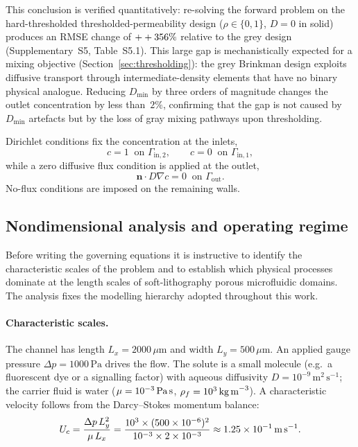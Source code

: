This conclusion is verified quantitatively: re-solving the forward
problem on the hard-thresholded thresholded-permeability design ($\rho \in \{0,1\}$,
$D = 0$ in solid) produces an RMSE change of $++356\%$
relative to the grey design (Supplementary~S5, Table~S5.1).
This large gap is mechanistically expected for a mixing objective
(Section~\ref{sec:thresholding}): the grey Brinkman design exploits
diffusive transport through intermediate-density elements that have
no binary physical analogue.
Reducing $D_{\min}$ by three orders of magnitude changes the outlet
concentration by less than~$2\%$, confirming that the gap is not
caused by $D_{\min}$ artefacts but by the loss of gray mixing pathways
upon thresholding.


Dirichlet conditions fix the concentration at the inlets,
\begin{equation}
    c = 1 \;\; \text{on } \Gamma_{\text{in},2}, \qquad c = 0 \;\; \text{on } \Gamma_{\text{in},1},
\end{equation}
while a zero diffusive flux condition is applied at the outlet,
\begin{equation}
    \mathbf{n}\cdot D\nabla c = 0 \;\; \text{on } \Gamma_{\text{out}}.
\end{equation}
No-flux conditions are imposed on the remaining walls.


\subsection{Nondimensional analysis and operating regime}
\label{sec:nondim}

Before writing the governing equations it is instructive to identify the
characteristic scales of the problem and to establish which physical
processes dominate at the length scales of soft-lithography porous microfluidic domains.
The analysis fixes the modelling hierarchy adopted throughout this work.

\paragraph{Characteristic scales.}
The channel has length $L_x = 2000\,\mu\text{m}$ and width
$L_y = 500\,\mu\text{m}$.
An applied gauge pressure $\Delta p = 1000\,\text{Pa}$ drives the flow.
The solute is a small molecule (e.g.\ a fluorescent dye or a signalling
factor) with aqueous diffusivity
$D = 10^{-9}\,\text{m}^{2}\,\text{s}^{-1}$; the carrier fluid is water
($\mu = 10^{-3}\,\text{Pa\,s}$,
$\rho_{f} = 10^{3}\,\text{kg\,m}^{-3}$).
A characteristic velocity follows from the Darcy--Stokes momentum balance:
%
\begin{equation}
  U_{c}
  = \frac{\Delta p \, L_{y}^{2}}{\mu \, L_{x}}
  = \frac{10^{3} \times (500\times10^{-6})^{2}}
         {10^{-3} \times 2\times10^{-3}}
  \approx 1.25\times10^{-1}\,\text{m\,s}^{-1}.
  \label{eq:Uc}
\end{equation}


